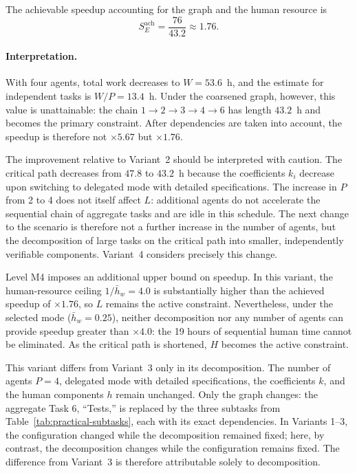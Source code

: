The achievable speedup accounting for the graph and the human resource is
\[
  S_E^{\text{ach}} = \frac{76}{43.2} \approx 1.76.
\]

\paragraph{Interpretation.}
With four agents, total work decreases to $W=53.6$~h, and the estimate for
independent tasks is $W/P=13.4$~h. Under the coarsened graph, however, this
value is unattainable: the chain $1 \to 2 \to 3 \to 4 \to 6$ has length
$43.2$~h and becomes the primary constraint. After dependencies are taken into
account, the speedup is therefore not $\times 5.67$ but $\times 1.76$.

The improvement relative to Variant~2 should be interpreted with caution. The
critical path decreases from $47.8$ to $43.2$~h because the coefficients $k_i$
decrease upon switching to delegated mode with detailed specifications. The
increase in $P$ from 2 to 4 does not itself affect $L$: additional agents do not
accelerate the sequential chain of aggregate tasks and are idle in this
schedule. The next change to the scenario is therefore not a further increase
in the number of agents, but the decomposition of large tasks on the critical
path into smaller, independently verifiable components. Variant~4 considers
precisely this change.

Level M4 imposes an additional upper bound on speedup. In this variant, the
human-resource ceiling $1/\bar{h}_w = 4.0$ is substantially higher than the
achieved speedup of $\times 1.76$, so $L$ remains the active constraint.
Nevertheless, under the selected mode ($\bar{h}_w = 0.25$), neither
decomposition nor any number of agents can provide speedup greater than
$\times 4.0$: the 19 hours of sequential human time cannot be eliminated. As
the critical path is shortened, $H$ becomes the active constraint.


This variant differs from Variant~3 only in its decomposition. The number of
agents $P = 4$, delegated mode with detailed specifications, the coefficients
$k$, and the human components $h$ remain unchanged. Only the graph changes: the
aggregate Task 6, ``Tests,'' is replaced by the three subtasks from
Table~\ref{tab:practical-subtasks}, each with its exact dependencies. In
Variants 1--3, the configuration changed while the decomposition remained
fixed; here, by contrast, the decomposition changes while the configuration
remains fixed. The difference from Variant~3 is therefore attributable solely
to decomposition.

